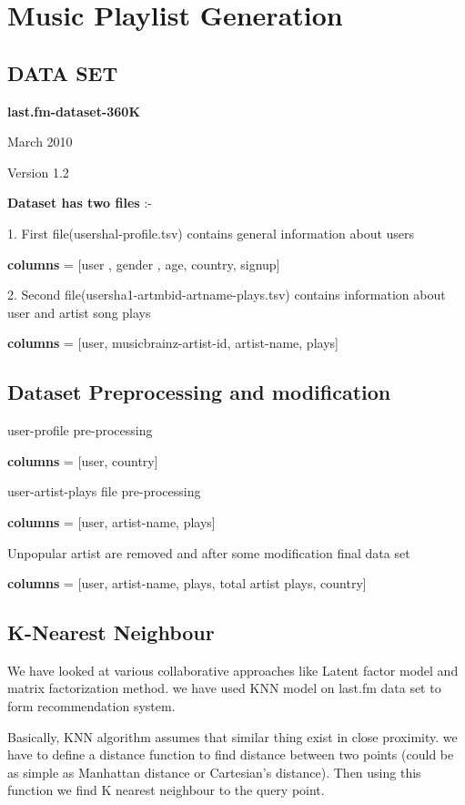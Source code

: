 \chapter{Music Playlist Generation}\label{final}
\section{DATA SET }

\textbf{last.fm-dataset-360K}

March 2010

Version 1.2


\textbf{Dataset has two files} :-
\begin{enumerate}
\end{enumerate}

1. First file(usershal-profile.tsv) contains general information about users

	\textbf{columns} = [user , gender , age, country, signup]

2. Second file(usersha1-artmbid-artname-plays.tsv) contains information about user and artist song plays

		\textbf{columns} = [user, musicbrainz-artist-id, artist-name, plays]



\section{Dataset Preprocessing and modification}

user-profile pre-processing

\textbf{columns} = [user, country]

user-artist-plays file pre-processing

\textbf{columns} = [user, artist-name, plays]

Unpopular artist are removed and after some modification final data set

\textbf{columns} = [user, artist-name, plays, total artist plays, country]



\section{K-Nearest Neighbour\cite{code}}
We have looked at various collaborative approaches like Latent factor model and matrix factorization method. we have used KNN model on last.fm data set to form recommendation system.

Basically, KNN algorithm assumes that similar thing exist in close proximity. we have to define a distance function to find distance between two points (could be as simple as Manhattan distance or Cartesian's distance). Then using this function we find K nearest neighbour to the query point.

